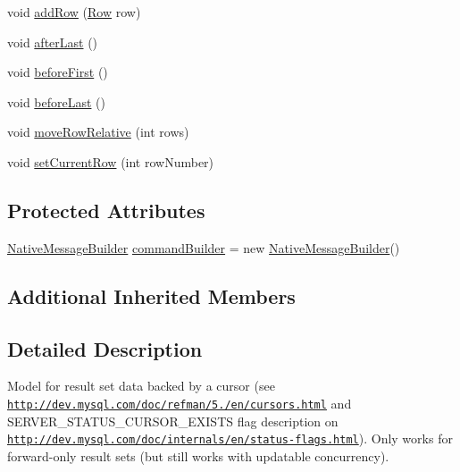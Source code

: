 \begin{DoxyCompactItemize}
void \mbox{\hyperlink{classcom_1_1mysql_1_1cj_1_1protocol_1_1a_1_1result_1_1_resultset_rows_cursor_a34e3f6465619fc988b570afca93db969}{add\+Row}} (\mbox{\hyperlink{interfacecom_1_1mysql_1_1cj_1_1result_1_1_row}{Row}} row)
\item 
void \mbox{\hyperlink{classcom_1_1mysql_1_1cj_1_1protocol_1_1a_1_1result_1_1_resultset_rows_cursor_a1fc9c638ba70a1fd6cabeb6ba0a2b0fe}{after\+Last}} ()
\item 
void \mbox{\hyperlink{classcom_1_1mysql_1_1cj_1_1protocol_1_1a_1_1result_1_1_resultset_rows_cursor_a3f7a11c46baddfde2c6ad5cc16c101d7}{before\+First}} ()
\item 
void \mbox{\hyperlink{classcom_1_1mysql_1_1cj_1_1protocol_1_1a_1_1result_1_1_resultset_rows_cursor_ad9ecb4a99d00c5fc3c2ada068b3d78e3}{before\+Last}} ()
\item 
void \mbox{\hyperlink{classcom_1_1mysql_1_1cj_1_1protocol_1_1a_1_1result_1_1_resultset_rows_cursor_af4a1433311e5089d29b554c81d0b006c}{move\+Row\+Relative}} (int rows)
\item 
void \mbox{\hyperlink{classcom_1_1mysql_1_1cj_1_1protocol_1_1a_1_1result_1_1_resultset_rows_cursor_aab53d9374408ceaf15369f0b515ab56e}{set\+Current\+Row}} (int row\+Number)
\end{DoxyCompactItemize}
\subsection*{Protected Attributes}
\begin{DoxyCompactItemize}
\item 
\mbox{\hyperlink{classcom_1_1mysql_1_1cj_1_1protocol_1_1a_1_1_native_message_builder}{Native\+Message\+Builder}} \mbox{\hyperlink{classcom_1_1mysql_1_1cj_1_1protocol_1_1a_1_1result_1_1_resultset_rows_cursor_a2873f0677be47b53bf5adec00d6719cc}{command\+Builder}} = new \mbox{\hyperlink{classcom_1_1mysql_1_1cj_1_1protocol_1_1a_1_1_native_message_builder}{Native\+Message\+Builder}}()
\end{DoxyCompactItemize}
\subsection*{Additional Inherited Members}


\subsection{Detailed Description}
Model for result set data backed by a cursor (see \href{http://dev.mysql.com/doc/refman/5.7/en/cursors.html}{\tt http\+://dev.\+mysql.\+com/doc/refman/5./en/cursors.\+html} and S\+E\+R\+V\+E\+R\+\_\+\+S\+T\+A\+T\+U\+S\+\_\+\+C\+U\+R\+S\+O\+R\+\_\+\+E\+X\+I\+S\+TS flag description on \href{http://dev.mysql.com/doc/internals/en/status-flags.html}{\tt http\+://dev.\+mysql.\+com/doc/internals/en/status-\/flags.\+html}). Only works for forward-\/only result sets (but still works with updatable concurrency). 

